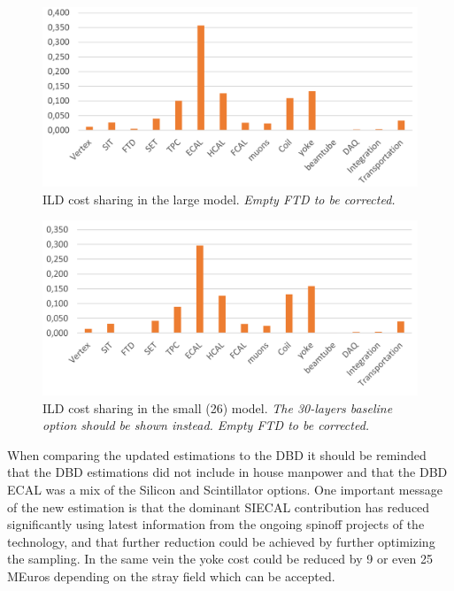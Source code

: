 \begin{figure}[h!]
\centering
\includegraphics[width=0.8\hsize]{Costing/Large_cost_sharing.PNG}
\caption{ILD cost sharing in the large model. \textit{Empty FTD to be corrected.}}
\label{Costing:Large_cost_sharing}
\end{figure}

\begin{figure}[h!]
\centering
\includegraphics[width=0.8\hsize]{Costing/Small_cost_sharing.PNG}
\caption{ILD cost sharing in the small (26) model. \textit{The 30-layers baseline option should be shown instead. Empty FTD to be corrected.}}
\label{Costing:Small_cost_sharing}
\end{figure}

When comparing the updated estimations to the DBD it should be reminded that the DBD estimations did not include in house manpower and that the DBD ECAL was a mix of the Silicon and Scintillator options. 
One important message of the new estimation is that the dominant SIECAL contribution has reduced significantly using latest information from the ongoing spinoff projects of the technology, and that further reduction could be achieved by further optimizing the sampling. In the same vein the yoke cost could be reduced by 9 or even 25 MEuros depending on the stray field which can be accepted.
